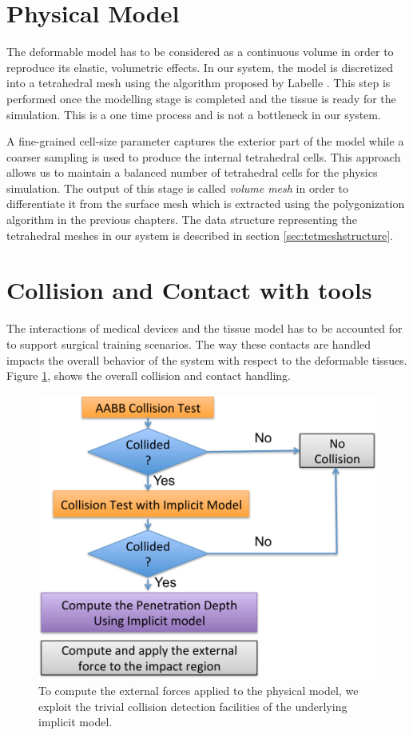 \section{Physical Model}
\label{sec:physicalmodel}
The deformable model has to be considered as a continuous volume in order to reproduce its elastic, 
volumetric effects. In our system, the \blob model is discretized into a tetrahedral mesh using the 
algorithm proposed by Labelle \etal \cite{Labelle2007}. This step is performed once the modelling stage is
completed and the tissue is ready for the simulation. This is a one time process and is not a bottleneck 
in our system. 

A fine-grained cell-size parameter captures the exterior part of the model while a coarser sampling is 
used to produce the internal tetrahedral cells. This approach allows us to maintain a balanced number 
of tetrahedral cells for the physics simulation. The output of this stage is called \textit{volume mesh} in 
order to differentiate it from the surface mesh which is extracted using the polygonization algorithm in 
the previous chapters. The data structure representing the tetrahedral meshes in our system is described 
in section \ref{sec:tetmeshstructure}.


\section{Collision and Contact with tools}
The interactions of medical devices and the tissue model has to be accounted for to support surgical 
training scenarios. The way these contacts are handled impacts the overall behavior of the system with 
respect to the deformable tissues. Figure \ref{fig:contact}, shows the overall 
collision and contact handling.

\begin{figure}[H]
  \centering
  \includegraphics[width=0.8\linewidth]{figures/deformable/contact.pdf}
  \caption{\label{fig:contact}
  {To compute the external forces applied to the physical model, we exploit the trivial collision detection 
  facilities of the underlying implicit model.}
}
\end{figure}

